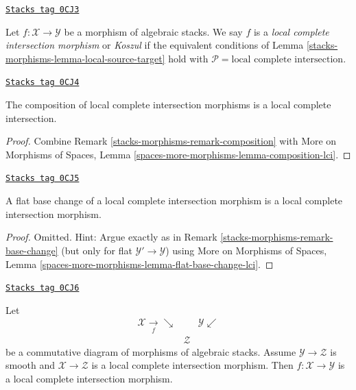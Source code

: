 \begin{definition}[Lci]
\label{stacks-morphisms-definition-lci}
\href{https://stacks.math.columbia.edu/tag/0CJ3}{\texttt{Stacks tag 0CJ3}}

Let $f : \mathcal{X} \to \mathcal{Y}$ be a morphism of algebraic stacks.
We say $f$ is a {\it local complete intersection morphism} or {\it Koszul}
if the equivalent conditions of
Lemma \ref{stacks-morphisms-lemma-local-source-target}
hold with $\mathcal{P} = \text{local complete intersection}$.
\end{definition}

\begin{lemma}
\label{stacks-morphisms-lemma-composition-lci}
\href{https://stacks.math.columbia.edu/tag/0CJ4}{\texttt{Stacks tag 0CJ4}}

The composition of local complete intersection morphisms is
a local complete intersection.
\end{lemma}

\begin{proof}
Combine
Remark \ref{stacks-morphisms-remark-composition}
with
More on Morphisms of Spaces, Lemma
\ref{spaces-more-morphisms-lemma-composition-lci}.
\end{proof}

\begin{lemma}
\label{stacks-morphisms-lemma-flat-base-change-lci}
\href{https://stacks.math.columbia.edu/tag/0CJ5}{\texttt{Stacks tag 0CJ5}}

A flat base change of a local complete intersection morphism is
a local complete intersection morphism.
\end{lemma}

\begin{proof}
Omitted. Hint: Argue exactly as in Remark \ref{stacks-morphisms-remark-base-change}
(but only for flat $\mathcal{Y}' \to \mathcal{Y}$) using
More on Morphisms of Spaces, Lemma
\ref{spaces-more-morphisms-lemma-flat-base-change-lci}.
\end{proof}

\begin{lemma}
\label{stacks-morphisms-lemma-lci-permanence}
\href{https://stacks.math.columbia.edu/tag/0CJ6}{\texttt{Stacks tag 0CJ6}}

Let
$$
\begin{array}{ccc}\mathcal{X} \underset{f}{\longrightarrow}\searrow &  & \mathcal{Y} \swarrow \\  & \mathcal{Z} & \end{array}
$$
be a commutative diagram of morphisms of algebraic stacks.
Assume $\mathcal{Y} \to \mathcal{Z}$ is smooth and
$\mathcal{X} \to \mathcal{Z}$ is a local complete intersection morphism.
Then $f : \mathcal{X} \to \mathcal{Y}$ is a
local complete intersection morphism.
\end{lemma}

